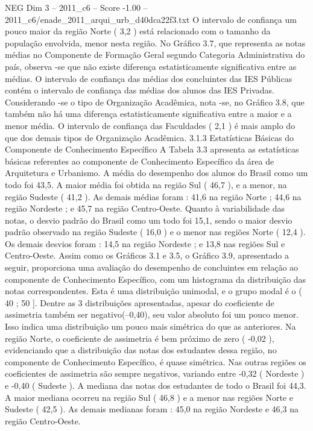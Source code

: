 \begin{textsample}{NEG Dim 3 – 2011\_c6 – Score -1.00 – 2011\_c6/enade\_2011\_arqui\_urb\_d40dca22f3.txt}
O intervalo de confiança um pouco maior da região Norte ( 3,2 ) está relacionado com o tamanho da população envolvida, menor nesta região.
No Gráfico 3.7, que representa as notas médias no Componente de Formação Geral segundo Categoria Administrativa do país, observa -se que não existe diferença estatisticamente significativa entre as médias.
O intervalo de confiança das médias dos concluintes das IES Públicas contém o intervalo de confiança das médias dos alunos das IES Privadas.
Considerando -se o tipo de Organização Acadêmica, nota -se, no Gráfico 3.8, que também não há uma diferença estatisticamente significativa entre a maior e a menor média.
O intervalo de confiança das Faculdades ( 2,1 ) é mais amplo do que dos demais tipos de Organização Acadêmica. 3.1.3 Estatísticas Básicas do Componente de Conhecimento Específico A Tabela 3.3 apresenta as estatísticas básicas referentes ao componente de Conhecimento Específico da área de Arquitetura e Urbanismo.
A média do desempenho dos alunos do Brasil como um todo foi 43,5.
A maior média foi obtida na região Sul ( 46,7 ), e a menor, na região Sudeste ( 41,2 ).
As demais médias foram : 41,6 na região Norte ; 44,6 na região Nordeste ; e 45,7 na região Centro-Oeste.
Quanto à variabilidade das notas, o desvio padrão do Brasil como um todo foi 15,1, sendo o maior desvio padrão observado na região Sudeste ( 16,0 ) e o menor nas regiões Norte ( 12,4 ).
Os demais desvios foram : 14,5 na região Nordeste ; e 13,8 nas regiões Sul e Centro-Oeste.
Assim como os Gráficos 3.1 e 3.5, o Gráfico 3.9, apresentado a seguir, proporciona uma avaliação do desempenho de concluintes em relação ao componente de Conhecimento Específico, com um histograma da distribuição das notas correspondentes.
Esta é uma distribuição unimodal, e o grupo modal é o ( 40 ; 50 ].
Dentre as 3 distribuições apresentadas, apesar do coeficiente de assimetria também ser negativo(–0,40), seu valor absoluto foi um pouco menor.
Isso indica uma distribuição um pouco mais simétrica do que as anteriores.
Na região Norte, o coeficiente de assimetria é bem próximo de zero ( -0,02 ), evidenciando que a distribuição das notas dos estudantes dessa região, no componente de Conhecimento Específico, é quase simétrica.
Nas outras regiões os coeficientes de assimetria são sempre negativos, variando entre -0,32 ( Nordeste ) e -0,40 ( Sudeste ).
A mediana das notas dos estudantes de todo o Brasil foi 44,3.
A maior mediana ocorreu na região Sul ( 46,8 ) e a menor nas regiões Norte e Sudeste ( 42,5 ).
As demais medianas foram : 45,0 na região Nordeste e 46,3 na região Centro-Oeste.

\end{textsample}
